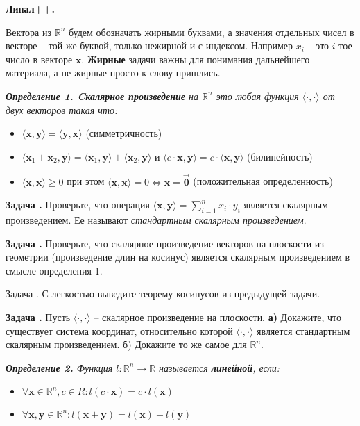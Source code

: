 \documentclass[12pt,a4paper]{article}
\def\R{\mathbb{R}}
\newcounter{znum}
\newcommand{\zz}[1]{\addtocounter{znum}{1} \textbf{Задача \arabic{znum}#1. }}
\newcommand{\z}[1]{\addtocounter{znum}{1} Задача \arabic{znum}#1. }
\begin{document}
\pagestyle{empty}

\begin{center} \Large \textbf{Линал++.}
\end{center}

Вектора из $\R^n$ будем обозначать жирными буквами, а значения отдельных чисел в векторе -- той же буквой, только нежирной и с индексом. Например $x_i$ -- это $i$-тое число в векторе $\mathbf{x}$. \textbf{Жирные} задачи важны для понимания дальнейшего материала, а не жирные просто к слову пришлись.

{\it \textbf{Определение 1. Cкалярное произведение} на $\R^n$ это любая функция $\langle \cdot , \cdot \rangle$ от двух векторов такая что:\par
\begin{itemize}
	\item $\langle \mathbf{x}, \mathbf{y} \rangle = \langle \mathbf{y}, \mathbf{x} \rangle$ (симметричность)
	\item $\langle \mathbf{x}_1 + \mathbf{x}_2, \mathbf{y} \rangle = \langle \mathbf{x}_1, \mathbf{y} \rangle + \langle \mathbf{x}_2, \mathbf{y} \rangle$  и $\langle c \cdot \mathbf{x}, \mathbf{y} \rangle = c \cdot \langle \mathbf{x}, \mathbf{y} \rangle$ (билинейность)
	\item $\langle \mathbf{x}, \mathbf{x} \rangle \geqslant 0$ при этом  $\langle \mathbf{x}, \mathbf{x} \rangle = 0 \Leftrightarrow \mathbf{x} = \overrightarrow{\mathbf{0}}$ (положительная определенность)
\end{itemize}
}

\zz{} Проверьте, что операция $ \langle \mathbf{x}, \mathbf{y} \rangle = \sum_{i = 1}^n x_i \cdot y_i$ является скалярным произведением. Ее называют {\it стандартным скалярным произведением}.

\zz{} Проверьте, что скалярное произведение векторов на плоскости из геометрии (произведение длин на косинус) является скалярным произведением в смысле определения 1.

\z{} С легкостью выведите теорему косинусов из предыдущей задачи.

\zz{} Пусть $\langle \cdot , \cdot \rangle$ -- скалярное произведение на плоскости. \textbf{а)} Докажите, что существует система координат, относительно которой $\langle \cdot , \cdot \rangle$ является \underline{стандартным} скалярным произведением. б) Докажите то же самое для $\R^n$.

{\it \textbf{Определение 2.} Функция $l: \R^ n \to \R$ называется \textbf{линейной}, если:
	\begin{itemize}
		\item $\forall \mathbf{x} \in \R^n, c \in R : l(c \cdot \mathbf{x}) = c \cdot l(\mathbf{x})$
		\item $\forall \mathbf{x}, \mathbf{y} \in \R^n : l(\mathbf{x} + \mathbf{y}) = l(\mathbf{x}) + l(\mathbf{y})$
	\end{itemize}
}
\end{document}

